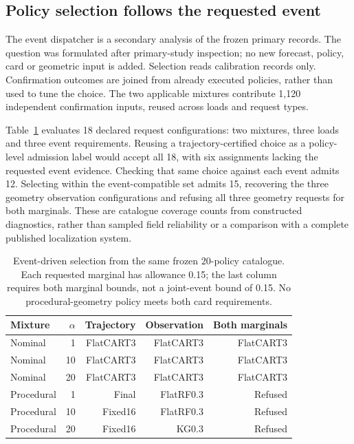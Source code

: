 \subsection{Policy selection follows the requested event}\label{sec:dispatch-evaluation}
The event dispatcher is a secondary analysis of the frozen primary records. The question was formulated after primary-study inspection; no new forecast, policy, card or geometric input is added. Selection reads calibration records only. Confirmation outcomes are joined from already executed policies, rather than used to tune the choice. The two applicable mixtures contribute 1,120 independent confirmation inputs, reused across loads and request types.

Table~\ref{tab:dispatchchoices} evaluates 18 declared request configurations: two mixtures, three loads and three event requirements. Reusing a trajectory-certified choice as a policy-level admission label would accept all 18, with six assignments lacking the requested event evidence. Checking that same choice against each event admits 12. Selecting within the event-compatible set admits 15, recovering the three geometry observation configurations and refusing all three geometry requests for both marginals. These are catalogue coverage counts from constructed diagnostics, rather than sampled field reliability or a comparison with a complete published localization system.
\begin{table}[!htbp]\centering\footnotesize
\caption{Event-driven selection from the same frozen 20-policy catalogue. Each requested marginal has allowance 0.15; the last column requires both marginal bounds, not a joint-event bound of 0.15. No procedural-geometry policy meets both card requirements.}\label{tab:dispatchchoices}
\begin{tabular}{@{}lrrrr@{}}\toprule
Mixture & $\alpha$ & Trajectory & Observation & Both marginals\\\midrule
Nominal & 1 & FlatCART3 & FlatCART3 & FlatCART3\\
Nominal & 10 & FlatCART3 & FlatCART3 & FlatCART3\\
Nominal & 20 & FlatCART3 & FlatCART3 & FlatCART3\\
Procedural & 1 & Final & FlatRF0.3 & Refused\\
Procedural & 10 & Fixed16 & FlatRF0.3 & Refused\\
Procedural & 20 & Fixed16 & KG0.3 & Refused\\
\bottomrule\end{tabular}\end{table}

